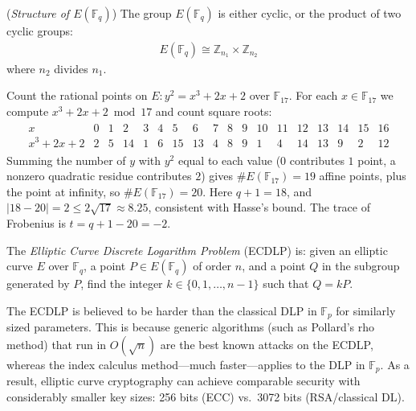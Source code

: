 \documentclass[a4paper, 12pt]{book} %
\begin{document}
\begin{theorem}
    (\emph{Structure of $E(\mathbb{F}_q)$}) The group $E(\mathbb{F}_q)$ is either cyclic, or the product of two cyclic groups:
    \begin{align}
        E(\mathbb{F}_q) \cong \mathbb{Z}_{n_1} \times \mathbb{Z}_{n_2}
    \end{align}
    where $n_2$ divides $n_1$.
\end{theorem}

\begin{example}
    Count the rational points on $E: y^2 = x^3 + 2x + 2$ over $\mathbb{F}_{17}$. For each $x \in \mathbb{F}_{17}$ we compute $x^3 + 2x + 2 \bmod 17$ and count square roots:
    \begin{align}
        \begin{array}{c|ccccccccccccccccc}
        x & 0&1&2&3&4&5&6&7&8&9&10&11&12&13&14&15&16 \\ \hline
        x^3+2x+2 & 2&5&14&1&6&15&13&4&8&9&1&4&14&13&9&2&12
        \end{array}
    \end{align}
    Summing the number of $y$ with $y^2$ equal to each value ($0$ contributes $1$ point, a nonzero quadratic residue contributes $2$) gives $\#E(\mathbb{F}_{17}) = 19$ affine points, plus the point at infinity, so $\#E(\mathbb{F}_{17}) = 20$. Here $q+1 = 18$, and $|18 - 20| = 2 \leq 2\sqrt{17} \approx 8.25$, consistent with Hasse's bound. The trace of Frobenius is $t = q + 1 - 20 = -2$.
\end{example}

\begin{definition}
    The \emph{Elliptic Curve Discrete Logarithm Problem} (ECDLP) is: given an elliptic curve $E$ over $\mathbb{F}_q$, a point $P \in E(\mathbb{F}_q)$ of order $n$, and a point $Q$ in the subgroup generated by $P$, find the integer $k \in \{0, 1, \ldots, n-1\}$ such that $Q = kP$.
\end{definition}

\begin{remark}
    The ECDLP is believed to be harder than the classical DLP in $\mathbb{F}_p$ for similarly sized parameters. This is because generic algorithms (such as Pollard's rho method) that run in $O(\sqrt{n})$ are the best known attacks on the ECDLP, whereas the index calculus method---much faster---applies to the DLP in $\mathbb{F}_p$. As a result, elliptic curve cryptography can achieve comparable security with considerably smaller key sizes: 256 bits (ECC) vs.\ 3072 bits (RSA/classical DL).
\end{remark}
\end{document}
